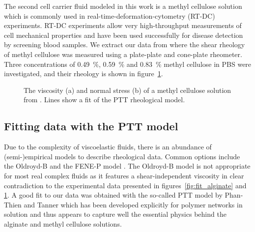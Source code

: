 \documentclass[a4paper,12pt]{scrartcl}
\begin{document}
The second cell carrier fluid modeled in this work is a methyl cellulose solution which is commonly used in real-time-deformation-cytometry (RT-DC) experiments.
RT-DC experiments allow very high-throughput measurements of cell mechanical properties and have been used successfully for disease detection by screening blood samples.
We extract our data from \cite{buyukurganci2023} where the shear rheology of methyl cellulose was measured using a plate-plate and cone-plate rheometer.
Three concentrations of \SI{0.49}{\percent}, \SI{0.59}{\percent} and \SI{0.83}{\percent} methyl cellulose in PBS were investigated, and their rheology is shown in figure~\ref{fig:fit_mc}.
	\begin{figure}[H]
		\centering
		\caption{The viscosity (a) and normal stress (b) of a methyl cellulose solution from \cite{buyukurganci2023}.
				Lines show a fit of the PTT rheological model.}
		\label{fig:fit_mc}
	\end{figure}

\subsection{Fitting data with the PTT model}

Due to the complexity of viscoelastic fluids, there is an abundance of (semi-)empirical models to describe rheological data.
Common options include the Oldroyd-B \cite{oldroyd1958} and the FENE-P model \cite{bird1980,bird1987}.
The Oldroyd-B model is not appropriate for most real complex fluids as it features a shear-independent viscosity in clear contradiction to the experimental data presented in figures~\ref{fig:fit_alginate} and \ref{fig:fit_mc}.
A good fit to our data was obtained with the so-called PTT model by Phan-Thien and Tanner \cite{phan-thien1977,phan-thien1978} which has been developed explicitly for polymer networks in solution and thus appears to capture well the essential physics behind the alginate and methyl cellulose solutions.
\end{document}
